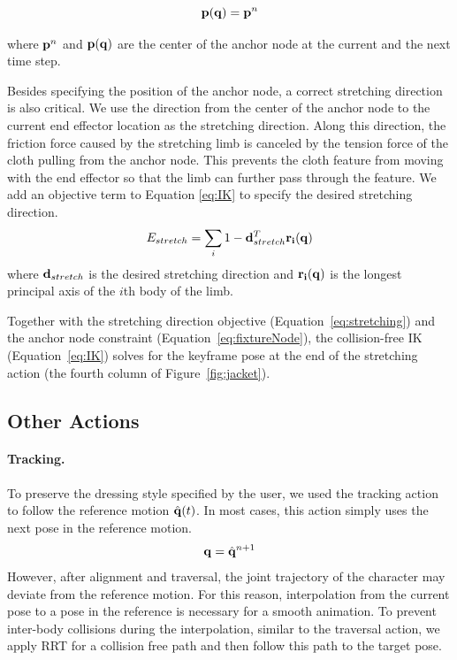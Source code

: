 \begin{equation}
  \mathbf{p}(\mathbf{q}) = \mathbf{p}^n
  \label{eq:fixtureNode}
\end{equation}

where $\mathbf{p}^n$ and $\mathbf{p(q)}$ are the center of the anchor node at the current and the next time step.

Besides specifying the position of the anchor node, a correct stretching direction is also critical. We use the direction from the center of the anchor node to the current end effector location as the stretching direction. Along this direction, the friction force caused by the stretching limb is canceled by the tension force of the cloth pulling from the anchor node. This prevents the cloth feature from moving with the end effector so that the limb can further pass through the feature. We add an objective term to Equation \ref{eq:IK} to specify the desired stretching direction.
\begin{equation}
  E_{stretch} = \sum_i1 - \mathbf{d}_{stretch}^T\mathbf{r_i(q)}
  \label{eq:stretching}
\end{equation}
where $\mathbf{d}_{stretch}$ is the desired stretching direction and $\mathbf{r_i(q)}$ is the longest principal axis of the $i$th body of the limb. 

Together with the stretching direction objective (Equation~\ref{eq:stretching}) and the anchor node constraint (Equation~\ref{eq:fixtureNode}), the collision-free IK (Equation~\ref{eq:IK}) solves for the keyframe pose at the end of the stretching action (the fourth column of Figure~\ref{fig:jacket}).

\subsection{Other Actions}

\paragraph{Tracking.} To preserve the dressing style specified by the user, we used the tracking action to follow the reference motion $\hat{\mathbf{q}}(t)$. In most cases, this action simply uses the next pose in the reference motion.
\begin{displaymath}
\mathbf{q} = \hat{\mathbf{q}}^{n+1}
\end{displaymath}
However, after alignment and traversal, the joint trajectory of the character may deviate from the reference motion. For this reason, interpolation from the current pose to a pose in the reference is necessary for a smooth animation. To prevent inter-body collisions during the interpolation, similar to the traversal action, we apply RRT for a collision free path and then follow this path to the target pose.


